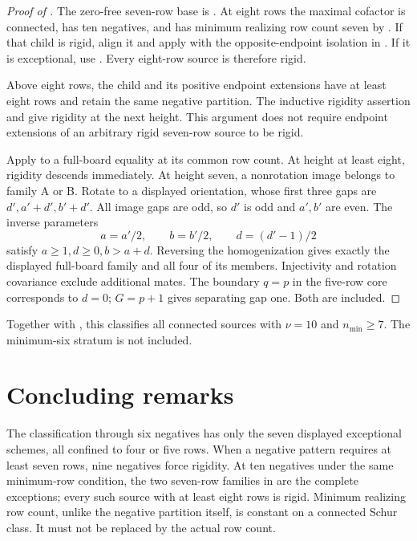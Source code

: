 \documentclass[11pt,a4paper]{amsart}
\numberwithin{equation}{section}
\theoremstyle{plain}
\theoremstyle{definition}
\begin{document}
\begin{proof}[Proof of ]
The zero-free seven-row base is .
At eight rows the maximal cofactor is connected, has ten negatives, and
has minimum realizing row count seven by .
If that child is rigid, align it and apply  with the
opposite-endpoint isolation in .
If it is exceptional, use .
Every eight-row source is therefore rigid.

Above eight rows, the child and its positive endpoint extensions have at
least eight rows and retain the same negative partition.  The inductive
rigidity assertion and  give rigidity at the next
height.  This argument does not require endpoint extensions of an
arbitrary rigid seven-row source to be rigid.

Apply  to a full-board equality at its common
row count.  At height at least eight, rigidity descends immediately.
At height seven, a nonrotation image belongs to family A or B.
Rotate to a displayed orientation, whose first three gaps are
\(d',a'+d',b'+d'\).  All image gaps are odd, so \(d'\) is odd and
\(a',b'\) are even.  The inverse parameters
\[
 a=a'/2,\qquad b=b'/2,\qquad d=(d'-1)/2
\]
satisfy \(a\ge1,d\ge0,b>a+d\).  Reversing the homogenization gives
exactly the displayed full-board family and all four of its members.
Injectivity and rotation covariance exclude additional mates.
The boundary \(q=p\) in the five-row core corresponds to \(d=0\);
\(G=p+1\) gives separating gap one.  Both are included.
\end{proof}

Together with , this classifies all
connected sources with \(\nu=10\) and \(n_{\min}\ge7\).
The minimum-six stratum is not included.

\section{Concluding remarks}\label{sec:conclusion}

The classification through six negatives has only the seven displayed
exceptional schemes, all confined to four or five rows.  When a negative
pattern requires at least seven rows, nine negatives force rigidity.
At ten negatives under the same minimum-row condition, the two seven-row
families in  are the complete
exceptions; every such source with at least eight rows is rigid.  Minimum realizing row
count, unlike the negative partition itself, is constant on a connected
Schur class.  It must not be replaced by the actual row count.
\end{document}
